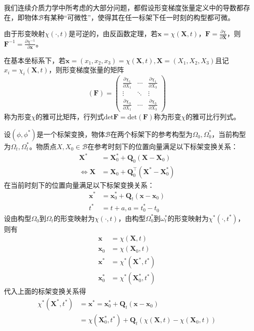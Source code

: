 \documentclass[main.tex]{subfiles}
\begin{document}
我们连续介质力学中所考虑的大部分问题，都假设形变梯度张量定义中的导数都存在，即物体$\mathcal{B}$有某种“可微性”，使得其在任一标架下任一时刻的构型都可微。

由于形变映射$\chi\left(\cdot,t\right)$是可逆的，由反函数定理，若$\mathbf{x}=\chi\left(\mathbf{X},t\right)$，$\mathbf{F}=\frac{\partial\chi}{\partial\mathbf{X}}$，则$\mathbf{F}^{-1}=\frac{\partial\chi^{-1}}{\partial\mathbf{x}}$。

在基本坐标系下，若$\mathbf{x}=\left(x_1,x_2,x_3\right)=\chi\left(\mathbf{X},t\right),\mathbf{X}=\left(X_1,X_2,X_3\right)$且记$x_i=\chi_i\left(\mathbf{X},t\right)$，则形变梯度张量的矩阵
\[
\left(\mathbf{F}\right)=\left(\begin{array}{ccc}
\frac{\partial\chi_1}{\partial X_1}&\cdots&\frac{\partial\chi_1}{\partial X_3}\\
\vdots&\ddots&\vdots\\
\frac{\partial\chi_3}{\partial X_1}&\cdots&\frac{\partial\chi_3}{\partial X_3}
\end{array}\right)\]
称为形变$\chi$的雅可比矩阵，行列式$\mathrm{det}\mathbf{F}=\mathrm{det}\left(\mathbf{F}\right)$称为形变$\chi$的雅可比行列式。

设$\left(\phi,\phi^*\right)$是一个标架变换，物体$\mathcal{B}$在两个标架下的参考构型为$\Omega_0^{},\Omega_0^*$，当前构型为$\Omega_t^{},\Omega_t^*$。物质点$X,X_0\in\mathcal{B}$在参考时刻下的位置向量满足以下标架变换关系：
\begin{align*}
\mathbf{X}_{}^*&=\mathbf{X}_0^*+\mathbf{Q}_0\left(\mathbf{X}-\mathbf{X}_0\right)\\
\Leftrightarrow\mathbf{X}&=\mathbf{X}_0+\mathbf{Q}_0^\intercal\left(\mathbf{X}_{}^*-\mathbf{X}_0^*\right)
\end{align*}
在当前时刻下的位置向量满足以下标架变换关系：
\begin{align*}
    \mathbf{x}_{}^*&=\mathbf{x}_0^*+\mathbf{Q}_t\left(\mathbf{x}-\mathbf{x}_0\right)\\
    t^*&=t+a,a=t_0^*-t_0^{}
\end{align*}
设由构型$\Omega_0$到$\Omega_t$的形变映射为$\chi\left(\cdot,t\right)$，由构型$\Omega_0^*$到$\omega_t^*$的形变映射为$\chi^*\left(\cdot,t^*\right)$，则有
\begin{align*}
\mathbf{x}&=\chi\left(\mathbf{X},t\right)\\
\mathbf{x}_0&=\chi\left(\mathbf{X}_0,t\right)\\
\mathbf{x}^*&=\chi^*\left(\mathbf{X}^*,t^*\right)\\
\mathbf{x}_0^*&=\chi^*\left(\mathbf{X}_0^*,t^*\right)
\end{align*}
代入上面的标架变换关系得
\begin{align*}
    \chi^*\left(\mathbf{X}^*,t^*\right)&=\mathbf{x}_{}^*=\mathbf{x}_0^*+\mathbf{Q}_t\left(\mathbf{x}-\mathbf{x}_0\right)\\
    &=\chi\left(\mathbf{X}_0^*,t^*\right)+\mathbf{Q}_t\left(\chi\left(\mathbf{X},t\right)-\chi\left(\mathbf{X}_0,t\right)\right)    
\end{align*}
\end{document}
